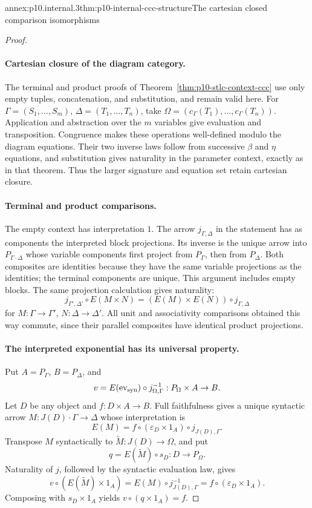 \begin{annexitem}{annex:p10.internal.3}{thm:p10-internal-ccc-structure}{The cartesian closed comparison isomorphisms}
\begin{proof}
\paragraph{Cartesian closure of the diagram category.}
The terminal and product proofs of
Theorem~\ref{thm:p10-stlc-context-ccc} use only empty tuples,
concatenation, and substitution, and remain valid here.
For \(\Gamma=(S_1,\ldots,S_m)\), \(\Delta=(T_1,\ldots,T_n)\),
take \(\Omega=(c_\Gamma(T_1),\ldots,c_\Gamma(T_n))\).
Application and abstraction over the \(m\) variables give evaluation
and transposition.  Congruence makes these operations well-defined
modulo the diagram equations.  Their two inverse laws follow from
successive \(\beta\) and \(\eta\) equations, and substitution gives
naturality in the parameter context, exactly as in that theorem.
Thus the larger signature and equation set retain cartesian closure.

\paragraph{Terminal and product comparisons.}
The empty context has interpretation \(1\).
The arrow \(j_{\Gamma,\Delta}\) in the statement has as components
the interpreted block projections.
Its inverse is the unique arrow into \(P_{\Gamma\cdot\Delta}\)
whose variable components first project from \(P_\Gamma\), then from
\(P_\Delta\).  Both composites are identities because they have the
same variable projections as the identities; the terminal components
are unique.  This argument includes empty blocks.
The same projection calculation gives naturality:
\[
 j_{\Gamma',\Delta'}\circ E(M\times N)
  =(E(M)\times E(N))\circ j_{\Gamma,\Delta}
\]
for \(M:\Gamma\to\Gamma'\), \(N:\Delta\to\Delta'\).
All unit and associativity comparisons obtained this way commute,
since their parallel composites have identical product projections.

\paragraph{The interpreted exponential has its universal property.}
Put \(A=P_\Gamma\), \(B=P_\Delta\), and
\[
 v=E(\operatorname{ev}_{\rm syn})\circ j_{\Omega,\Gamma}^{-1}
                      :P_\Omega\times A\to B.
\]
Let \(D\) be any object and \(f:D\times A\to B\).
Full faithfulness gives a unique syntactic arrow
\(M:J(D)\cdot\Gamma\to\Delta\) whose interpretation is
\[
 E(M)=f\circ(\varepsilon_D\times1_A)\circ j_{J(D),\Gamma}.
\]
Transpose \(M\) syntactically to \(\widetilde M:J(D)\to\Omega\),
and put
\[
 q=E(\widetilde M)\circ s_D:D\to P_\Omega.
\]
Naturality of \(j\), followed by the syntactic evaluation law, gives
\[
 v\circ(E(\widetilde M)\times1_A)
       =E(M)\circ j_{J(D),\Gamma}^{-1}
       =f\circ(\varepsilon_D\times1_A).
\]
Composing with \(s_D\times1_A\) yields \(v\circ(q\times1_A)=f\).


\end{proof}
\end{annexitem}
